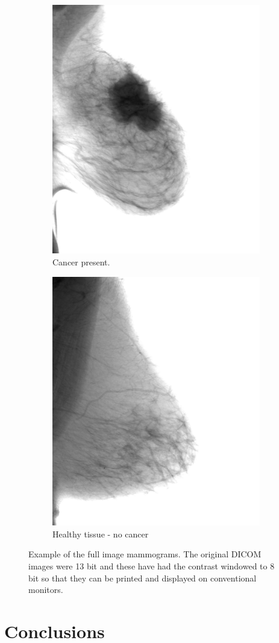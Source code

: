 \documentclass[12pt]{article}
\begin{document}
\begin{figure}
\centering
\begin{subfigure}{.5\textwidth}
  \centering
  \includegraphics[width=.7\linewidth]{cancer.jpg}
  \caption{Cancer present.}
  \label{fig:sub1}
\end{subfigure}%
\begin{subfigure}{.5\textwidth}
  \centering
  \includegraphics[width=.7\linewidth]{noCancer.jpg}
  \caption{Healthy tissue - no cancer}
  \label{fig:sub2}
\end{subfigure}
\caption{Example of the full image mammograms.  The original DICOM images were 13 bit and these have had the contrast windowed to 8 bit so that they can be printed and displayed on conventional monitors.}
\label{fig:test}
\end{figure}
\FloatBarrier
\section{Conclusions}

\newpage
%
\printbibliography
\end{document}
